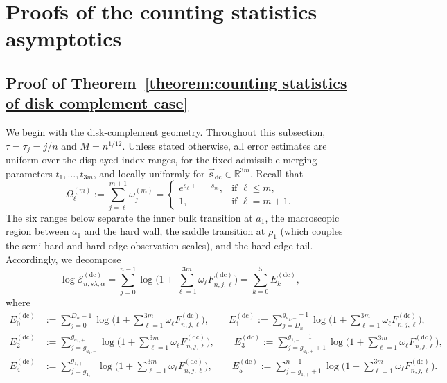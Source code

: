 \documentclass[a4paper]{article}
\numberwithin{equation}{section}
\begin{document}
\section{Proofs of the counting statistics asymptotics}
\label{section:counting-proofs}
\label{section:proof of calen part}

\subsection{Proof of Theorem~\ref{theorem:counting statistics of disk complement case}}
We begin with the disk-complement geometry.  Throughout this subsection,
$\tau=\tau_j=j/n$ and $M=n^{1/12}$.  Unless stated otherwise, all error
estimates are uniform over the displayed index ranges, for the fixed
admissible merging parameters $t_1,\ldots,t_{3m}$, and locally uniformly for
$\vec{\boldsymbol s}_{\mathrm{dc}}\in\mathbb R^{3m}$.  Recall that
\begin{equation}
    \Omega_{\ell}^{(m)}:=\sum_{j=\ell}^{m+1}\omega_j^{(m)}
    =\begin{cases}
        e^{s_{\ell}+\cdots+s_{m}}, & \mbox{if } \ell\leq m, \\
        1, & \mbox{if } \ell=m+1. 
    \end{cases}
\end{equation}
The six ranges below separate the inner bulk transition at $a_1$, the
macroscopic region between $a_1$ and the hard wall, the saddle transition at
$\rho_1$ (which couples the semi-hard and hard-edge observation scales), and
the hard-edge tail.  Accordingly, we decompose
\[
\log \mathcal{E}_{n,s\lambda,\alpha}^{(\mathrm{dc})}=
\sum_{j=0}^{n-1}\log\Big( 
1+\sum_{\ell=1}^{3m}\omega_{\ell}F_{n,j,\ell}^{(\mathrm{dc})}
\Bigr)=\sum_{k=0}^5 E_k^{(\mathrm{dc})}, 
\]
where 
\begin{align*}
E_0^{(\mathrm{dc})}&:=\sum_{j=0}^{D_n-1}\log\Big( 
1+\sum_{\ell=1}^{3m}\omega_{\ell}F_{n,j,\ell}^{(\mathrm{dc})}
\Bigr), \qquad
E_1^{(\mathrm{dc})}:=\sum_{j=D_n}^{g_{a_1,-}-1}\log\Big( 
1+\sum_{\ell=1}^{3m}\omega_{\ell}F_{n,j,\ell}^{(\mathrm{dc})}
\Bigr), \\
E_2^{(\mathrm{dc})}&:=\sum_{j=g_{a_1,-}}^{g_{a_1,+}}\log\Big( 
1+\sum_{\ell=1}^{3m}\omega_{\ell}F_{n,j,\ell}^{(\mathrm{dc})}
\Bigr),\qquad
E_3^{(\mathrm{dc})}:=\sum_{j=g_{a_1,+}+1}^{g_{1,-}-1}\log\Big( 
1+\sum_{\ell=1}^{3m}\omega_{\ell}F_{n,j,\ell}^{(\mathrm{dc})}
\Bigr), \\
E_4^{(\mathrm{dc})}&:=\sum_{j=g_{1,-}}^{g_{1,+}}\log\Big( 
1+\sum_{\ell=1}^{3m}\omega_{\ell}F_{n,j,\ell}^{(\mathrm{dc})}
\Bigr),\qquad
E_5^{(\mathrm{dc})}:=\sum_{j=g_{1,+}+1}^{n-1}\log\Big( 
1+\sum_{\ell=1}^{3m}\omega_{\ell}F_{n,j,\ell}^{(\mathrm{dc})}
\Bigr). 
\end{align*}
\end{document}
